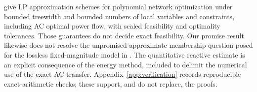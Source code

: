 \citet[Theorem 7 and Corollary 8 of the arXiv version]{BienstockMunoz2018}
give LP approximation schemes for polynomial network optimization under
bounded treewidth and bounded numbers of local variables and constraints,
including AC optimal power flow, with scaled feasibility and optimality
tolerances. Those guarantees do not decide exact feasibility.
Our promise result likewise does not resolve the unpromised
approximate-membership question posed for the lossless fixed-magnitude
model in \citet[Section 1.3]{BienstockVermaPreprint2019}.
The quantitative reactive estimate is an explicit consequence of the
energy method, included to delimit the numerical use of the exact AC
transfer. Appendix~\ref{app:verification} records reproducible
exact-arithmetic checks; these support, and do not replace, the proofs.
